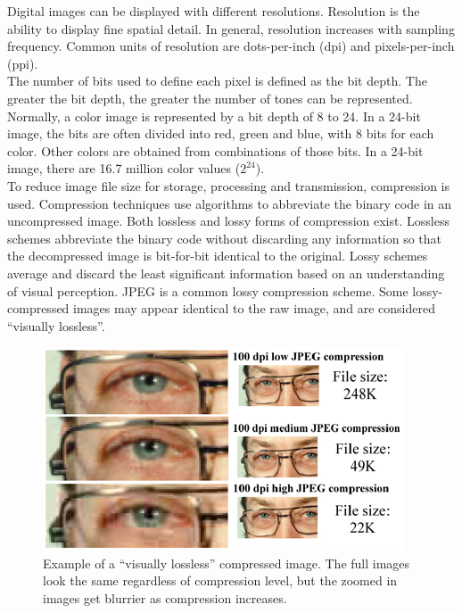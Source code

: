 \documentclass[]{article}
\begin{document}
\noindent Digital images can be displayed with different resolutions.  Resolution is the ability to display fine spatial detail.  In general, resolution increases with sampling frequency.  Common units of resolution are dots-per-inch (dpi) and pixels-per-inch (ppi).   \\ 

\noindent The number of bits used to define each pixel is defined as the bit depth.  The greater the bit depth, the greater the number of tones can be represented.  Normally, a color image is represented by a bit depth of 8 to 24.  In a 24-bit image, the bits are often divided into red, green and blue, with 8 bits for each color.  Other colors are obtained from combinations of those bits.  In a 24-bit image, there are 16.7 million color values ($2^{24}$).  	\\ 

\noindent To reduce image file size for storage, processing and transmission, compression is used.  Compression techniques use algorithms to abbreviate the binary code in an uncompressed image.  Both lossless and lossy forms of compression exist. Lossless schemes abbreviate the binary code without discarding any information so that the decompressed image is bit-for-bit identical to the original.  Lossy schemes average and discard the least significant information based on an understanding of visual perception.  JPEG is a common lossy compression scheme.  Some lossy-compressed images may appear identical to the raw image, and are considered ``visually lossless''.  \cite{cornell} 

\begin{figure}[h]
      			\centering
      			\includegraphics[scale=0.75]{./images/research_image_processing_2}
			\caption{Example of a ``visually lossless'' compressed image.  The full images look the same regardless of compression level, but the zoomed in images get blurrier as compression increases.}
			\label{fig:research_image_processing_2}
   		 \end{figure}
\end{document}
